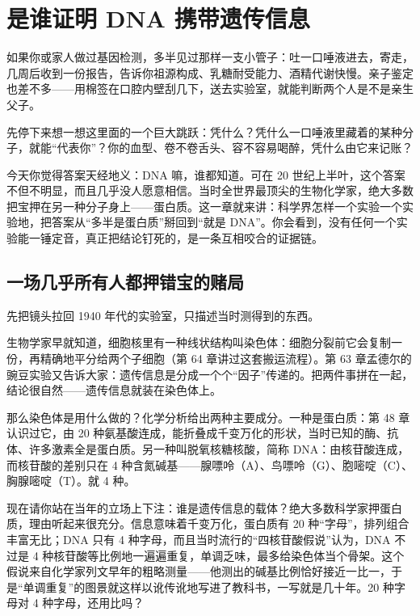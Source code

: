 \chapter{是谁证明 DNA 携带遗传信息}

\begin{kaichang}
如果你或家人做过基因检测，多半见过那样一支小管子：吐一口唾液进去，寄走，几周后收到一份报告，告诉你祖源构成、乳糖耐受能力、酒精代谢快慢。亲子鉴定也差不多——用棉签在口腔内壁刮几下，送去实验室，就能判断两个人是不是亲生父子。

先停下来想一想这里面的一个巨大跳跃：凭什么？凭什么一口唾液里藏着的某种分子，就能“代表你”？你的血型、卷不卷舌头、容不容易喝醉，凭什么由它来记账？

今天你觉得答案天经地义：DNA 嘛，谁都知道。可在 20 世纪上半叶，这个答案不但不明显，而且几乎没人愿意相信。当时全世界最顶尖的生物化学家，绝大多数把宝押在另一种分子身上——蛋白质。这一章就来讲：科学界怎样一个实验一个实验地，把答案从“多半是蛋白质”掰回到“就是 DNA”。你会看到，没有任何一个实验能一锤定音，真正把结论钉死的，是一条互相咬合的证据链。
\end{kaichang}

\section{一场几乎所有人都押错宝的赌局}

先把镜头拉回 1940 年代的实验室，只描述当时测得到的东西。

生物学家早就知道，细胞核里有一种线状结构叫染色体：细胞分裂前它会复制一份，再精确地平分给两个子细胞（第 64 章讲过这套搬运流程）。第 63 章孟德尔的豌豆实验又告诉大家：遗传信息是分成一个个“因子”传递的。把两件事拼在一起，结论很自然——遗传信息就装在染色体上。

那么染色体是用什么做的？化学分析给出两种主要成分。一种是蛋白质：第 48 章认识过它，由 20 种氨基酸连成，能折叠成千变万化的形状，当时已知的酶、抗体、许多激素全是蛋白质。另一种叫脱氧核糖核酸，简称 DNA：由核苷酸连成，而核苷酸的差别只在 4 种含氮碱基——腺嘌呤（A）、鸟嘌呤（G）、胞嘧啶（C）、胸腺嘧啶（T）。就 4 种。

现在请你站在当年的立场上下注：谁是遗传信息的载体？绝大多数科学家押蛋白质，理由听起来很充分。信息意味着千变万化，蛋白质有 20 种“字母”，排列组合丰富无比；DNA 只有 4 种字母，而且当时流行的“四核苷酸假说”认为，DNA 不过是 4 种核苷酸等比例地一遍遍重复，单调乏味，最多给染色体当个骨架。这个假说来自化学家列文早年的粗略测量——他测出的碱基比例恰好接近一比一，于是“单调重复”的图景就这样以讹传讹地写进了教科书，一写就是几十年。20 种字母对 4 种字母，还用比吗？


